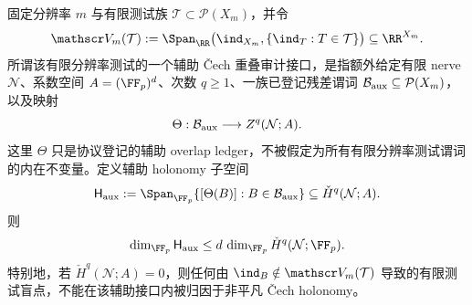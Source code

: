 \begin{proposition}[辅助重叠审计的有限秩界与测试缺陷分离]\label{distill:cech_cohomology-finite_nerve_obstruction_bounds-stat-auxiliary-overlap-audit-rank-split}
固定分辨率 \(m\) 与有限测试族 \(\mathcal T\subset\mathcal P(X_m)\)，并令
\[
\mathscr V_m(\mathcal T)
:=\Span_{\RR}\bigl(\ind_{X_m},\{\ind_T:T\in\mathcal T\}\bigr)
\subseteq \RR^{X_m}.
\]
所谓该有限分辨率测试的一个辅助 \v Cech 重叠审计接口，是指额外给定有限 nerve \(\mathcal N\)、系数空间 \(A=(\FF_p)^d\)、次数 \(q\ge1\)、一族已登记残差谓词 \(\mathcal B_{\rm aux}\subseteq\mathcal P(X_m)\)，以及映射
\[
\Theta:\mathcal B_{\rm aux}\longrightarrow Z^q(\mathcal N;A).
\]
这里 \(\Theta\) 只是协议登记的辅助 overlap ledger，不被假定为所有有限分辨率测试谓词的内在不变量。定义辅助 holonomy 子空间
\[
\mathsf H_{\rm aux}:=\Span_{\FF_p}\{[\Theta(B)]:B\in\mathcal B_{\rm aux}\}
\subseteq \check H^q(\mathcal N;A).
\]
则
\[
\dim_{\FF_p}\mathsf H_{\rm aux}\le d\,\dim_{\FF_p}\check H^q(\mathcal N;\FF_p).
\]
特别地，若 \(\check H^q(\mathcal N;A)=0\)，则任何由 \(\ind_B\notin\mathscr V_m(\mathcal T)\) 导致的有限测试盲点，不能在该辅助接口内被归因于非平凡 \v Cech holonomy。
\end{proposition}

